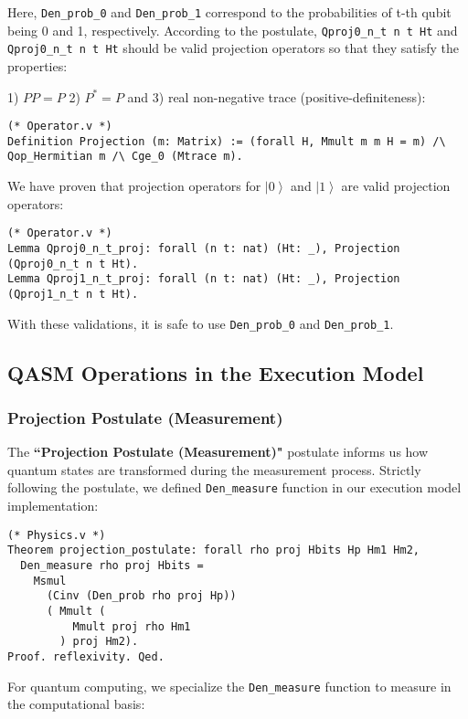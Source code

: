 \documentclass[10pt,a4paper]{article}
\newcommand{\<}{\langle}
\renewcommand{\>}{\rangle}
\newcommand{\ket}[1]{\left\vert #1 \right\>}
\begin{document}
Here, \texttt{Den\_prob\_0} and \texttt{Den\_prob\_1} correspond to the probabilities of
t-th qubit being 0 and 1, respectively.
According to the postulate, \texttt{Qproj0\_n\_t n t Ht} and
\texttt{Qproj0\_n\_t n t Ht} should be valid projection operators so that they satisfy the properties:

1) $P P = P$
2) $P^* = P$
and 3) real non-negative trace (positive-definiteness):

\begin{lstlisting}
(* Operator.v *)
Definition Projection (m: Matrix) := (forall H, Mmult m m H = m) /\ Qop_Hermitian m /\ Cge_0 (Mtrace m).
\end{lstlisting}

We have proven that projection operators for $\ket{0}$ and $\ket{1}$ are
valid projection operators:

\begin{lstlisting}
(* Operator.v *)
Lemma Qproj0_n_t_proj: forall (n t: nat) (Ht: _), Projection (Qproj0_n_t n t Ht).
Lemma Qproj1_n_t_proj: forall (n t: nat) (Ht: _), Projection (Qproj1_n_t n t Ht).
\end{lstlisting}

With these validations, it is safe to use \texttt{Den\_prob\_0} and
\texttt{Den\_prob\_1}.


\subsection{QASM Operations in the Execution Model}

\subsubsection{Projection Postulate (Measurement)}

The \textbf{``Projection Postulate (Measurement)"} postulate informs us how quantum
states are transformed during the measurement process.
Strictly following the postulate, we defined \texttt{Den\_measure} function in
our execution model implementation:

\begin{lstlisting}
(* Physics.v *)
Theorem projection_postulate: forall rho proj Hbits Hp Hm1 Hm2,
  Den_measure rho proj Hbits =
    Msmul
      (Cinv (Den_prob rho proj Hp))
      ( Mmult (
          Mmult proj rho Hm1
        ) proj Hm2).
Proof. reflexivity. Qed.
\end{lstlisting}

For quantum computing, we specialize the \texttt{Den\_measure} function to
measure in the computational basis:
\end{document}
